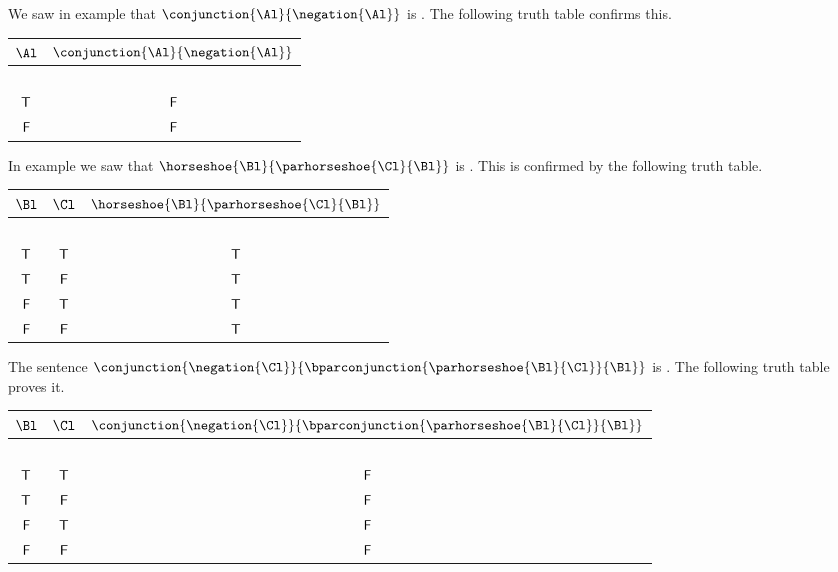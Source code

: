 \begin{majorILnc}{}
We saw in example  that $\conjunction{\Al}{\negation{\Al}}$ is . 
The following truth table confirms this. 
\begin{center}
\begin{tabular}{ c c }
$\Al$ & $\conjunction{\Al}{\negation{\Al}}$ \\
\hline
$ $ & $ $ \\[-.25cm]
$\mathsf{T}$ & $\mathsf{F}$ \\
$\mathsf{F}$ & $\mathsf{F}$ \\
\end{tabular}
\end{center}
\end{majorILnc}
\begin{majorILnc}{}
In example  we saw that $\horseshoe{\Bl}{\parhorseshoe{\Cl}{\Bl}}$ is .
This is confirmed by the following truth table. 
\begin{center}
\begin{tabular}{ c c c }
$\Bl$ & $\Cl$ & $\horseshoe{\Bl}{\parhorseshoe{\Cl}{\Bl}}$ \\
\hline
$ $ & $ $ & $ $ $ $ \\[-.25cm]
$\mathsf{T}$ & $\mathsf{T}$ & $\mathsf{T}$ \\
$\mathsf{T}$ & $\mathsf{F}$& $\mathsf{T}$ \\
$\mathsf{F}$ & $\mathsf{T}$ & $\mathsf{T}$ \\
$\mathsf{F}$ & $\mathsf{F}$  & $\mathsf{T}$ \\
\end{tabular}
\end{center}
\end{majorILnc}
\begin{majorILnc}{}
The sentence $\conjunction{\negation{\Cl}}{\bparconjunction{\parhorseshoe{\Bl}{\Cl}}{\Bl}}$ is .
The following truth table proves it.  
\begin{center}
\begin{tabular}{ c c c }
$\Bl$ & $\Cl$ & $\conjunction{\negation{\Cl}}{\bparconjunction{\parhorseshoe{\Bl}{\Cl}}{\Bl}}$ \\
\hline
$ $ & $ $ & \\[-.25cm]
$\mathsf{T}$ & $\mathsf{T}$ & $\mathsf{F}$ \\
$\mathsf{T}$ & $\mathsf{F}$& $\mathsf{F}$ \\
$\mathsf{F}$ & $\mathsf{T}$ & $\mathsf{F}$ \\
$\mathsf{F}$ & $\mathsf{F}$  & $\mathsf{F}$ \\
\end{tabular}
\end{center}
\end{majorILnc} 

